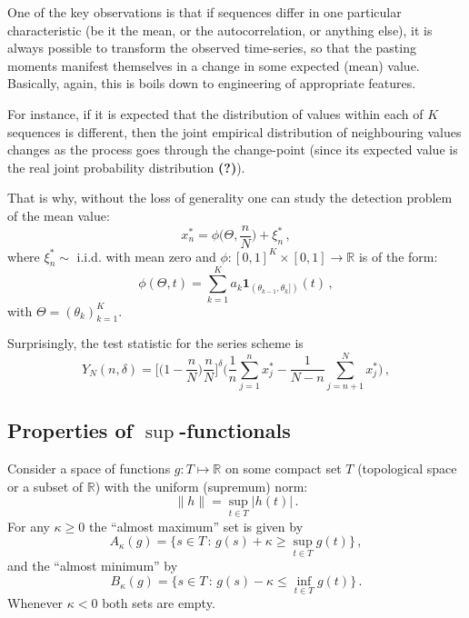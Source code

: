 \documentclass[a4paper]{article}
\newcommand{\Real}{\mathbb{R}}
\newcommand{\one}{\mathbf{1}}
\newcommand{\wat}{\textbf{(?)}}
\begin{document}
One of the key observations is that if sequences differ in one particular characteristic
(be it the mean, or the autocorrelation, or anything else), it is always possible to
transform the observed time-series, so that the pasting moments manifest themselves
in a change in some expected (mean) value. Basically, again, this is boils down to
engineering of appropriate features.

For instance, if it is expected that the distribution of values within each of $K$
sequences is different, then the joint empirical distribution of neighbouring values
changes as the process goes through the change-point (since its expected value is
the real joint probability distribution \wat).

That is why, without the loss of generality one can study the detection problem of
the mean value:
\[ x^*_n = \phi\biggl(\Theta, \frac{n}{N}\biggr) + \xi^*_n\,, \]
where $\xi^*_n\sim$ i.i.d. with mean zero and $\phi: [0,1]^K\times[0,1]\to \Real$ is
of the form:
\[ \phi(\Theta, t) = \sum_{k=1}^K a_k \one_{(\theta_{k-1},\theta_k])}(t) \,, \]
with $\Theta = (\theta_k)_{k=1}^K$.
  

Surprisingly, the test statistic for the series scheme is
\[ Y_N(n,\delta) = \biggl[ \biggl(1-\frac{n}{N}\biggr) \frac{n}{N} \biggr]^\delta
				  \biggl(  \frac{1}{n} \sum_{j=1}^n x^*_j
				  		 - \frac{1}{N-n} \sum_{j=n+1}^N x^*_j \biggr) \,, \]



\subsection{Properties of $\sup$-functionals} %
\label{sub:properties_of_sup_functionals}

Consider a space of functions $g: T\mapsto \Real$ on some compact set $T$ (topological space
or a subset of $\Real$) with the uniform (supremum) norm:
\[ \|h\| = \sup_{t\in T} | h(t) | \,. \]
For any $\kappa\geq 0$ the ``almost maximum'' set is given by
\[ A_\kappa(g) = \bigl\{ s\in T \,:\, g(s) + \kappa \geq \sup_{t\in T} g(t) \bigr\}\,, \]
and the ``almost minimum'' by
\[ B_\kappa(g) = \bigl\{ s\in T \,:\, g(s) - \kappa \leq \inf_{t\in T} g(t) \bigr\}\,. \]
Whenever $\kappa<0$ both sets are empty.
\end{document}
